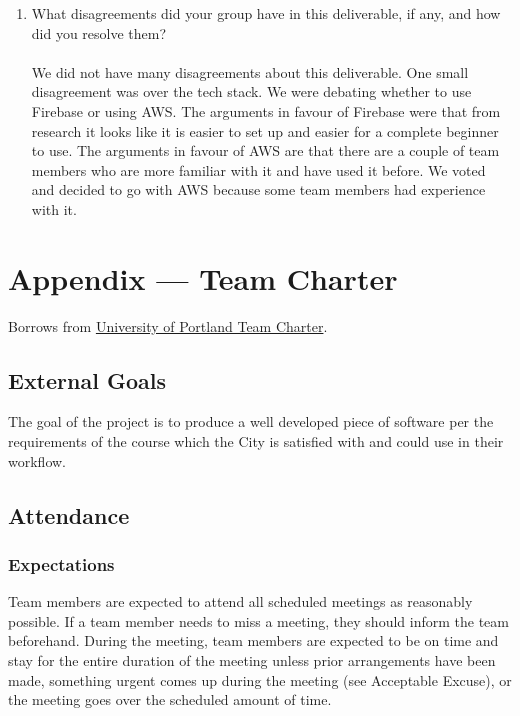 \documentclass{article}
\begin{document}
\begin{enumerate}
  \item What disagreements did your group have in this deliverable, if any,
    and how did you resolve them?\\
    \\
    We did not have many disagreements about this deliverable. One
    small disagreement was over the tech
    stack. We were debating whether to use Firebase or using AWS. The
    arguments in favour of Firebase
    were that from research it looks like it is easier to set up and
    easier for a complete beginner to use. The
    arguments in favour of AWS are that there are a couple of team
    members who are more familiar with it
    and have used it before. We voted and decided to go with AWS
    because some team members had
    experience with it.
\end{enumerate}

\newpage{}

\section*{Appendix --- Team Charter}

Borrows from
\href{https://engineering.up.edu/industry_partnerships/files/team-charter.pdf}
{University of Portland Team Charter}.

\subsection*{External Goals}

The goal of the project is to produce a well developed piece of
software per the requirements of the course
which the City is satisfied with and could use in their workflow.

\subsection*{Attendance}

\subsubsection*{Expectations}

Team members are expected to attend all scheduled meetings as
reasonably possible. If a team member
needs to miss a meeting, they should inform the team beforehand.
During the meeting, team members are
expected to be on time and stay for the entire duration of the
meeting unless prior arrangements have been
made, something urgent comes up during the meeting (see Acceptable
Excuse), or the meeting goes over the
scheduled amount of time.
\end{document}
